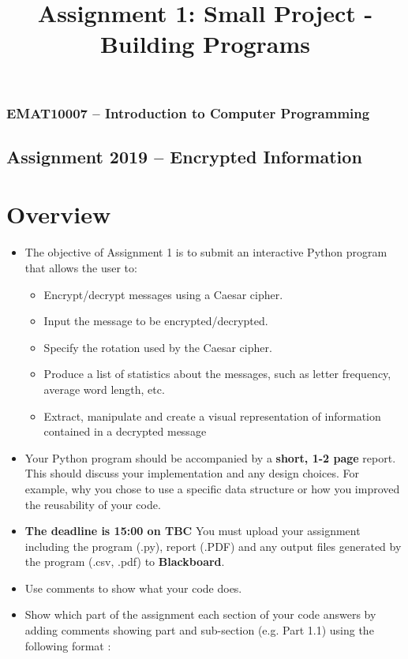 \documentclass[11pt]{report}
\begin{document}
\title{Assignment 1: Small Project - Building Programs}
\subsubsection*{EMAT10007 -- Introduction to Computer Programming}
\subsection*{\Large Assignment 2019 -- Encrypted Information}

\section*{Overview}
\begin{itemize}
	\item The objective of Assignment 1 is to submit an interactive Python program that allows the user to:
	\begin{itemize}
		\item Encrypt/decrypt messages using a Caesar cipher.
		\item Input the message to be encrypted/decrypted.
		\item Specify the rotation used by the Caesar cipher.
		\item Produce a list of statistics about the messages, such as letter frequency, average word length, etc.
		\item Extract, manipulate and create a visual representation of information contained in a decrypted message 
	\end{itemize}
	\item Your Python program should be accompanied by a {\bf short, 1-2 page} report. This should discuss your implementation and any design choices. For example, why you chose to use a specific data structure or how you improved the reusability of your code. 
 	\item \textbf{The \textbf{deadline is 15:00 on TBC}} You must upload your assignment including the program (.py), report (.PDF) and any output files generated by the program (.csv, .pdf) to \textbf{Blackboard}.
	\item Use comments to show what your code does. 
	\item Show which part of the assignment each section of your code answers by adding comments showing part and sub-section (e.g. Part 1.1) using the following format :


\end{itemize}
\end{document}
